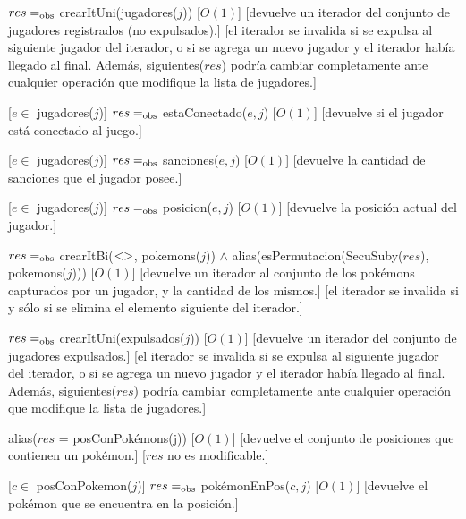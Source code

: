 \begin{Interfaz}
	{$res =_{\mathrm{obs}}$ crearItUni(jugadores($j$))}
	[$O(1)$]
	[devuelve un iterador del conjunto de jugadores registrados (no expulsados).]
	[el iterador se invalida si se expulsa al siguiente jugador del iterador, o si se agrega un nuevo jugador y el iterador había llegado al final. Además, siguientes($res$) podría cambiar completamente ante cualquier operación que modifique la lista de jugadores.]

	[$e \in$ jugadores($j$)]
	{$res =_{\mathrm{obs}}$ estaConectado($e, j$)}
	[$O(1)$]
	[devuelve si el jugador está conectado al juego.]

	[$e \in$ jugadores($j$)]
	{$res =_{\mathrm{obs}}$ sanciones($e, j$)}
	[$O(1)$]
	[devuelve la cantidad de sanciones que el jugador posee.]

	[$e \in$ jugadores($j$)]
	{$res =_{\mathrm{obs}}$ posicion($e, j$)}
	[$O(1)$]
	[devuelve la posición actual del jugador.]

	{$res =_{\mathrm{obs}}$ crearItBi($<>$, pokemons($j$)) $\land$ alias(esPermutacion(SecuSuby($res$), pokemons($j$)))}
	[$O(1)$]
	[devuelve un iterador al conjunto de los pokémons capturados por un jugador, y la cantidad de los mismos.]
	[el iterador se invalida si y sólo si se elimina el elemento siguiente del iterador.]

	{$res =_{\mathrm{obs}}$ crearItUni(expulsados($j$))}
	[$O(1)$]
	[devuelve un iterador del conjunto de jugadores expulsados.]
	[el iterador se invalida si se expulsa al siguiente jugador del iterador, o si se agrega un nuevo jugador y el iterador había llegado al final. Además, siguientes($res$) podría cambiar completamente ante cualquier operación que modifique la lista de jugadores.]

	{alias($res$ = posConPokémons(j))}
	[$O(1)$]
	[devuelve el conjunto de posiciones que contienen un pokémon.]
	[$res$ no es modificable.]

	[$c \in$ posConPokemon($j$)]
	{$res =_{\mathrm{obs}}$ pokémonEnPos($c,j$)}
	[$O(1)$]
	[devuelve el pokémon que se encuentra en la posición.]


\end{Interfaz}
